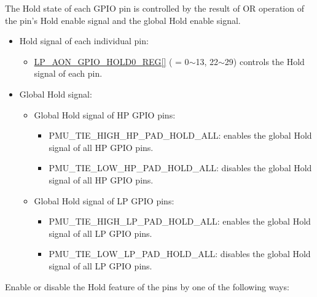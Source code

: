 \documentclass[main\_\_EN.tex]{subfiles}
\begin{document}
The Hold state of each GPIO pin is controlled by the result of OR operation of the pin's Hold enable signal and the global Hold enable signal.
\begin{itemize}
    \item Hold signal of each individual pin:
    \begin{itemize}
        \item \hyperref[regdesc:LPAONGPIOHOLD0REG]{LP\_AON\_GPIO\_HOLD0\_REG[]} ( = 0$\sim$13, 22$\sim$29) controls the Hold signal of each pin.
        \end{itemize}
    \item Global Hold signal:
        \begin{itemize}
            \item Global Hold signal of HP GPIO pins: 
            \begin{itemize}
                \item PMU\_TIE\_HIGH\_HP\_PAD\_HOLD\_ALL: enables the global Hold signal of all HP GPIO pins.
                \item PMU\_TIE\_LOW\_HP\_PAD\_HOLD\_ALL: disables the global Hold signal of all HP GPIO pins. 
            \end{itemize}
            \item Global Hold signal of LP GPIO pins: 
            \begin{itemize}
                \item PMU\_TIE\_HIGH\_LP\_PAD\_HOLD\_ALL: enables the global Hold signal of all LP GPIO pins.
                \item PMU\_TIE\_LOW\_LP\_PAD\_HOLD\_ALL: disables the global Hold signal of all LP GPIO pins.
            \end{itemize}
        \end{itemize}
    \end{itemize}
Enable or disable the Hold feature of the pins by one of the following ways:
\end{document}
